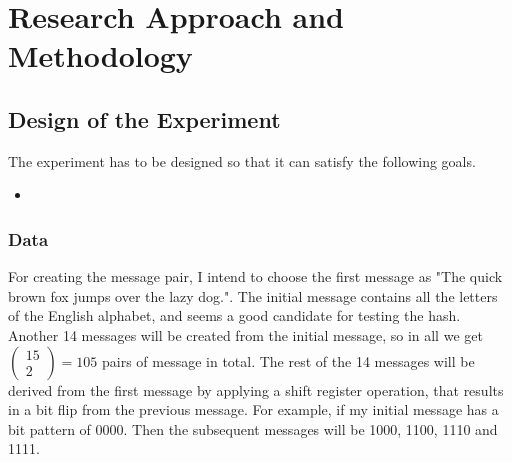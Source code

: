 \chapter{Research Approach and Methodology}







\section{Design of the Experiment}

The experiment has to be designed so that it can satisfy the following goals.

\begin{itemize}
\item 
\end{itemize}

  \subsection{Data}
  
  For creating the message pair, I intend to choose the first message as "The quick brown fox jumps over the lazy dog.".
  The initial message contains all the letters of the English alphabet, and seems a good candidate for testing the hash.
  Another 14 messages will be created from the initial message, so in all we get $\begin{pmatrix} 15 \\ 2 \end{pmatrix}
  = 105$ pairs of message in total. The rest of the 14 messages will be derived from the first message by applying a
  shift register operation, that results in a bit flip from the previous message. For example, if my initial message has
  a bit pattern of 0000. Then the subsequent messages will be 1000, 1100, 1110 and 1111.

